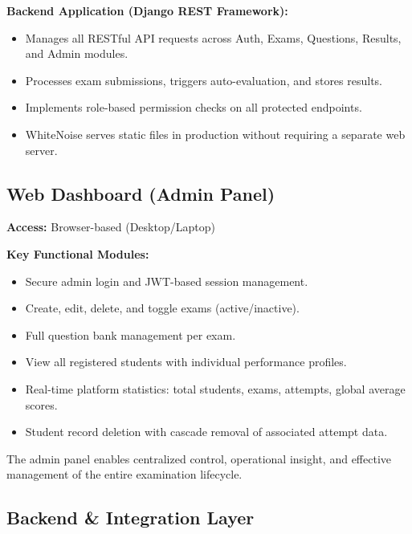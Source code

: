 \documentclass[12pt,a4paper]{article}
\begin{document}
\textbf{Backend Application (Django REST Framework):}
\begin{itemize}[leftmargin=1.5em]
  \item Manages all RESTful API requests across Auth, Exams, Questions, Results, and Admin modules.
  \item Processes exam submissions, triggers auto-evaluation, and stores results.
  \item Implements role-based permission checks on all protected endpoints.
  \item WhiteNoise serves static files in production without requiring a separate web server.
\end{itemize}

\subsection{Web Dashboard (Admin Panel)}

\textbf{Access:} Browser-based (Desktop/Laptop)

\textbf{Key Functional Modules:}
\begin{itemize}[leftmargin=1.5em]
  \item Secure admin login and JWT-based session management.
  \item Create, edit, delete, and toggle exams (active/inactive).
  \item Full question bank management per exam.
  \item View all registered students with individual performance profiles.
  \item Real-time platform statistics: total students, exams, attempts, global average scores.
  \item Student record deletion with cascade removal of associated attempt data.
\end{itemize}

\begin{notebox}
The admin panel enables centralized control, operational insight, and effective management of the entire examination lifecycle.
\end{notebox}

\subsection{Backend \& Integration Layer}
\end{document}
